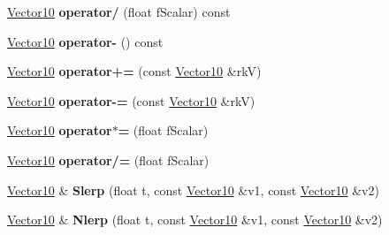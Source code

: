 \begin{DoxyCompactItemize}
\item 
\hyperlink{class_i_dream_sky_1_1_vector10}{Vector10} {\bfseries operator/} (float f\+Scalar) const \hypertarget{class_i_dream_sky_1_1_vector10_aabe6dc4e835aa76eced770e3b82f0f0a}{}\label{class_i_dream_sky_1_1_vector10_aabe6dc4e835aa76eced770e3b82f0f0a}

\item 
\hyperlink{class_i_dream_sky_1_1_vector10}{Vector10} {\bfseries operator-\/} () const \hypertarget{class_i_dream_sky_1_1_vector10_af8b311cbcfe9646794131beb1df6dc20}{}\label{class_i_dream_sky_1_1_vector10_af8b311cbcfe9646794131beb1df6dc20}

\item 
\hyperlink{class_i_dream_sky_1_1_vector10}{Vector10} {\bfseries operator+=} (const \hyperlink{class_i_dream_sky_1_1_vector10}{Vector10} \&rkV)\hypertarget{class_i_dream_sky_1_1_vector10_aab1a4d9f0a487bbfdfbcc8b8140d22c6}{}\label{class_i_dream_sky_1_1_vector10_aab1a4d9f0a487bbfdfbcc8b8140d22c6}

\item 
\hyperlink{class_i_dream_sky_1_1_vector10}{Vector10} {\bfseries operator-\/=} (const \hyperlink{class_i_dream_sky_1_1_vector10}{Vector10} \&rkV)\hypertarget{class_i_dream_sky_1_1_vector10_a39cef899c99c030438e9512f6f2e3da2}{}\label{class_i_dream_sky_1_1_vector10_a39cef899c99c030438e9512f6f2e3da2}

\item 
\hyperlink{class_i_dream_sky_1_1_vector10}{Vector10} {\bfseries operator$\ast$=} (float f\+Scalar)\hypertarget{class_i_dream_sky_1_1_vector10_a72075716f6a1cc1a67292e4077284c2c}{}\label{class_i_dream_sky_1_1_vector10_a72075716f6a1cc1a67292e4077284c2c}

\item 
\hyperlink{class_i_dream_sky_1_1_vector10}{Vector10} {\bfseries operator/=} (float f\+Scalar)\hypertarget{class_i_dream_sky_1_1_vector10_a62db9fe111d06d12a8c8015e10b6dbf6}{}\label{class_i_dream_sky_1_1_vector10_a62db9fe111d06d12a8c8015e10b6dbf6}

\item 
\hyperlink{class_i_dream_sky_1_1_vector10}{Vector10} \& {\bfseries Slerp} (float t, const \hyperlink{class_i_dream_sky_1_1_vector10}{Vector10} \&v1, const \hyperlink{class_i_dream_sky_1_1_vector10}{Vector10} \&v2)\hypertarget{class_i_dream_sky_1_1_vector10_a7d500af40d4cafcc97b23aec102f9e7f}{}\label{class_i_dream_sky_1_1_vector10_a7d500af40d4cafcc97b23aec102f9e7f}

\item 
\hyperlink{class_i_dream_sky_1_1_vector10}{Vector10} \& {\bfseries Nlerp} (float t, const \hyperlink{class_i_dream_sky_1_1_vector10}{Vector10} \&v1, const \hyperlink{class_i_dream_sky_1_1_vector10}{Vector10} \&v2)\hypertarget{class_i_dream_sky_1_1_vector10_a452794484f03970e4e7942856112f145}{}\label{class_i_dream_sky_1_1_vector10_a452794484f03970e4e7942856112f145}


\end{DoxyCompactItemize}
